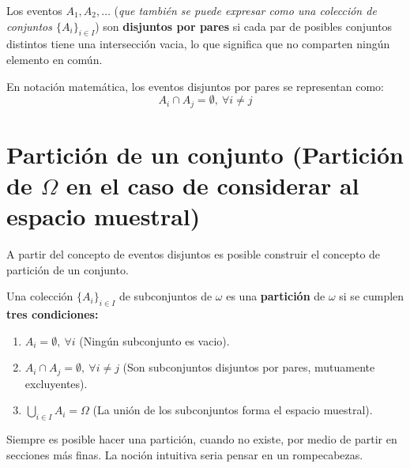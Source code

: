 \documentclass[
  letterpaper,
  DIV=11,
  numbers=noendperiod]{scrreprt}
\providecommand{\tightlist}{%
  \setlength{\itemsep}{0pt}\setlength{\parskip}{0pt}}
\begin{document}
Los eventos \(A_1, A_2, \ldots\) (\emph{que también se puede expresar
como una colección de conjuntos \(\{A_i\}_{i \in I}\)}) son
\textbf{disjuntos por pares} si cada par de posibles conjuntos distintos
tiene una intersección vacia, lo que significa que no comparten ningún
elemento en común.

En notación matemática, los eventos disjuntos por pares se representan
como: \[
A_i \cap A_j = \emptyset, \ \forall i \neq j
\]

\section{\texorpdfstring{Partición de un conjunto (Partición de
\(\Omega\) en el caso de considerar al espacio
muestral)}{Partición de un conjunto (Partición de \textbackslash Omega en el caso de considerar al espacio muestral)}}\label{particiuxf3n-de-un-conjunto-particiuxf3n-de-omega-en-el-caso-de-considerar-al-espacio-muestral}

A partir del concepto de eventos disjuntos es posible construir el
concepto de partición de un conjunto.

\begin{tcolorbox}[enhanced jigsaw, arc=.35mm, bottomrule=.15mm, bottomtitle=1mm, breakable, colback=white, colbacktitle=quarto-callout-warning-color!10!white, colframe=quarto-callout-warning-color-frame, coltitle=black, left=2mm, leftrule=.75mm, opacityback=0, opacitybacktitle=0.6, rightrule=.15mm, title={Definición de Partición de un conjunto}, titlerule=0mm, toprule=.15mm, toptitle=1mm]

Una colección \(\{A_i\}_{i \in I}\) de subconjuntos de \(\omega\) es una
\textbf{partición} de \(\omega\) si se cumplen \textbf{tres
condiciones:}

\begin{enumerate}
\def\labelenumi{\arabic{enumi}.}
\tightlist
\item
  \(A_i = \emptyset, \ \forall i\) (Ningún subconjunto es vacio).
\item
  \(A_i \cap A_j = \emptyset, \ \forall i \neq j\) (Son subconjuntos
  disjuntos por pares, mutuamente excluyentes).
\item
  \(\bigcup_{i \in I}A_i = \Omega\) (La unión de los subconjuntos forma
  el espacio muestral).
\end{enumerate}

\end{tcolorbox}

Siempre es posible hacer una partición, cuando no existe, por medio de
partir en secciones más finas. La noción intuitiva seria pensar en un
rompecabezas.
\end{document}
